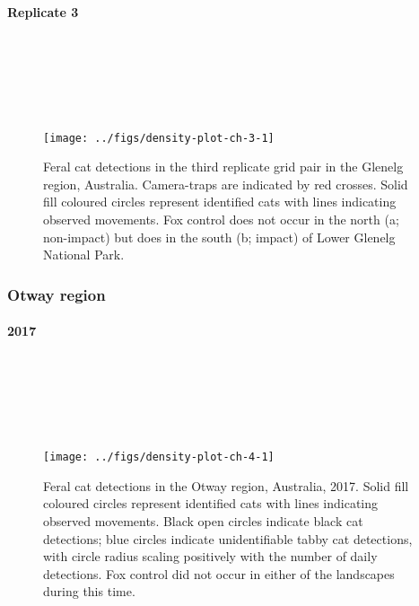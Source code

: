 \documentclass[preprint, 3p, authoryear]{elsarticle} %
\begin{document}
\newpage

\hypertarget{replicate-3}{%
\paragraph{Replicate 3}\label{replicate-3}}

\(~\)

\(~\)

\(~\)

\begin{figure}

{\centering \texttt{[image: ../figs/density-plot-ch-3-1]} 

}

\caption{Feral cat detections in the third replicate grid pair in the Glenelg region, Australia. Camera-traps are indicated by red crosses. Solid fill coloured circles represent identified cats with lines indicating observed movements. Fox control does not occur in the north (a; non-impact) but does in the south (b; impact) of Lower Glenelg National Park.}\label{fig:density-plot-ch-3}
\end{figure}

\newpage

\hypertarget{otway-region-1}{%
\subsubsection{Otway region}\label{otway-region-1}}

\hypertarget{section}{%
\paragraph{2017}\label{section}}

\(~\)

\(~\)

\(~\)

\begin{figure}

{\centering \texttt{[image: ../figs/density-plot-ch-4-1]} 

}

\caption{Feral cat detections in the Otway region, Australia, 2017. Solid fill coloured circles represent identified cats with lines indicating observed movements. Black open circles indicate black cat detections; blue circles indicate unidentifiable tabby cat detections, with circle radius scaling positively with the number of daily detections. Fox control did not occur in either of the landscapes during this time.}\label{fig:density-plot-ch-4}
\end{figure}
\end{document}
